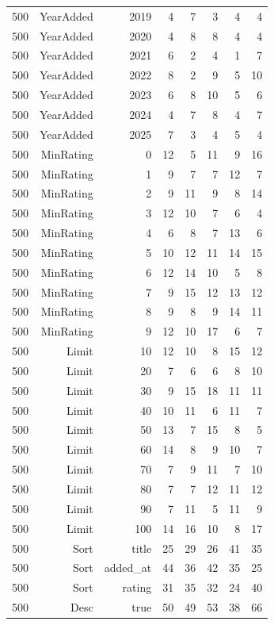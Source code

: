 \begin{longtable}{rrrrrrrr}
	500 & YearAdded & 2019 & 4 & 7 & 3 & 4 & 4 \\
	500 & YearAdded & 2020 & 4 & 8 & 8 & 4 & 4 \\
	500 & YearAdded & 2021 & 6 & 2 & 4 & 1 & 7 \\
	500 & YearAdded & 2022 & 8 & 2 & 9 & 5 & 10 \\
	500 & YearAdded & 2023 & 6 & 8 & 10 & 5 & 6 \\
	500 & YearAdded & 2024 & 4 & 7 & 8 & 4 & 7 \\
	500 & YearAdded & 2025 & 7 & 3 & 4 & 5 & 4 \\
	500 & MinRating & 0 & 12 & 5 & 11 & 9 & 16 \\
	500 & MinRating & 1 & 9 & 7 & 7 & 12 & 7 \\
	500 & MinRating & 2 & 9 & 11 & 9 & 8 & 14 \\
	500 & MinRating & 3 & 12 & 10 & 7 & 6 & 4 \\
	500 & MinRating & 4 & 6 & 8 & 7 & 13 & 6 \\
	500 & MinRating & 5 & 10 & 12 & 11 & 14 & 15 \\
	500 & MinRating & 6 & 12 & 14 & 10 & 5 & 8 \\
	500 & MinRating & 7 & 9 & 15 & 12 & 13 & 12 \\
	500 & MinRating & 8 & 9 & 8 & 9 & 14 & 11 \\
	500 & MinRating & 9 & 12 & 10 & 17 & 6 & 7 \\
	500 & Limit & 10 & 12 & 10 & 8 & 15 & 12 \\
	500 & Limit & 20 & 7 & 6 & 6 & 8 & 10 \\
	500 & Limit & 30 & 9 & 15 & 18 & 11 & 11 \\
	500 & Limit & 40 & 10 & 11 & 6 & 11 & 7 \\
	500 & Limit & 50 & 13 & 7 & 15 & 8 & 5 \\
	500 & Limit & 60 & 14 & 8 & 9 & 10 & 7 \\
	500 & Limit & 70 & 7 & 9 & 11 & 7 & 10 \\
	500 & Limit & 80 & 7 & 7 & 12 & 11 & 12 \\
	500 & Limit & 90 & 7 & 11 & 5 & 11 & 9 \\
	500 & Limit & 100 & 14 & 16 & 10 & 8 & 17 \\
	500 & Sort & title & 25 & 29 & 26 & 41 & 35 \\
	500 & Sort & added\_at & 44 & 36 & 42 & 35 & 25 \\
	500 & Sort & rating & 31 & 35 & 32 & 24 & 40 \\
	500 & Desc & true & 50 & 49 & 53 & 38 & 66 \\

\end{longtable}
